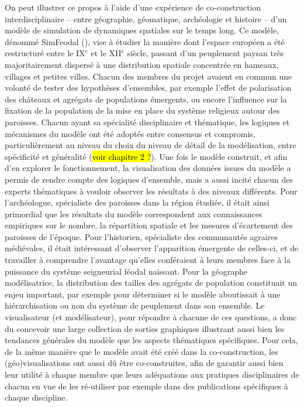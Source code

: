\documentclass[a4paper, 12pt]{article}
\begin{document}
On peut illustrer ce propos à l'aide d'une expérience de co-construction interdisciplinaire -- entre géographie, géomatique, archéologie et histoire -- d'un modèle de simulation de dynamiques spatiales sur le temps long.
Ce modèle, dénommé SimFeodal (\cite{cura_transition_2017}), vise à étudier la manière dont l'espace européen a été restructuré entre le IX$^e$ et le XII$^e$ siècle, passant d'un peuplement paysan très majoritairement dispersé à une distribution spatiale concentrée en hameaux, villages et petites villes.
Chacun des membres du projet avaient en commun une volonté de tester des hypothèses d'ensembles, par exemple l'effet de polarisation des châteaux et agrégats de populations émergents, ou encore l'influence sur la fixation de la population de la mise en place du système religieux autour des paroisses.
Chacun ayant sa spécialité disciplinaire et thématique, les logiques et mécanismes du modèle ont été adoptés entre consensus et compromis, particulièrement au niveau du choix du niveau de détail de la modélisation, entre spécificité et généralité (\hl{voir chapitre 2 ?}).
Une fois le modèle construit, et afin d'en explorer le fonctionnement, la visualisation des données issues du modèle a permis de rendre compte des logiques d'ensemble, mais a aussi incité chacun des experts thématiques à vouloir observer les résultats à des niveaux différents.
Pour l'archéologue, spécialiste des paroisses dans la région étudiée, il était ainsi primordial que les résultats du modèle correspondent aux connaissances empiriques sur le nombre, la répartition spatiale et les mesures d'écartement des paroisses de l'époque.
Pour l'historien, spécialiste des communautés agraires médiévales, il était intéressant d'observer l'apparition émergente de celles-ci, et de travailler à comprendre l'avantage qu'elles conféraient à leurs membres face à la puissance du système seigneurial féodal naissant.
Pour la géographe modélisatrice, la distribution des tailles des agrégats de population constituait un enjeu important, par exemple pour déterminer si le modèle aboutissait à une hiérarchisation ou non du système de peuplement dans son ensemble.
Le visualisateur (et modélisateur), pour répondre à chacune de ces questions, a donc du concevoir une large collection de sorties graphiques illustrant aussi bien les tendances générales du modèle que les aspects thématiques spécifiques.
Pour cela, de la même manière que le modèle avait été créé dans la co-construction, les (géo)visualisations ont aussi dû être co-construites, afin de garantir aussi bien leur utilité à chaque membre que leurs adéquations aux pratiques disciplinaires de chacun en vue de les ré-utiliser par exemple dans des publications spécifiques à chaque discipline.
\end{document}
